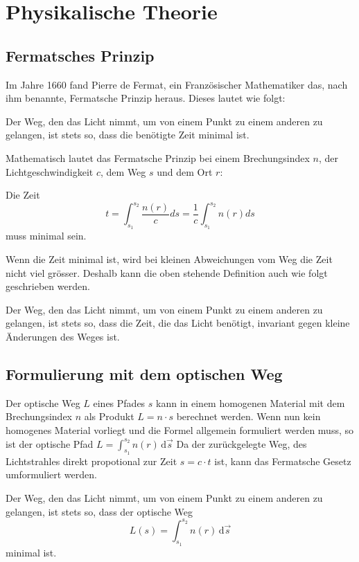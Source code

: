 \section{Physikalische Theorie}

\subsection{Fermatsches Prinzip}
Im Jahre 1660 fand Pierre de Fermat, 
ein Französischer Mathematiker das, 
nach ihm benannte, Fermatsche Prinzip heraus. 
Dieses lautet wie folgt:

Der Weg, den das Licht nimmt, 
um von einem Punkt zu einem anderen zu gelangen, 
ist stets so, dass die benötigte Zeit minimal ist.

Mathematisch lautet das Fermatsche Prinzip bei einem Brechungsindex $n$, 
der Lichtgeschwindigkeit $c$, dem Weg $s$ und dem Ort $r$: 

Die Zeit
\[
t= \int_{s_1}^{s_2} \frac{n(r)}{c} ds =
\frac{1}{c} \int_{s_1}^{s_2} n(r) ds
\]
muss minimal sein.

Wenn die Zeit minimal ist, 
wird bei kleinen Abweichungen vom Weg die Zeit nicht viel grösser. 
Deshalb kann die oben stehende Definition auch wie folgt geschrieben werden.

Der Weg, den das Licht nimmt, 
um von einem Punkt zu einem anderen zu gelangen, 
ist stets so, dass die Zeit, die das Licht benötigt, 
invariant gegen kleine Änderungen des Weges ist.

\subsection{Formulierung mit dem optischen Weg}
Der optische Weg $L$  eines Pfades $s$ kann in einem homogenen Material 
mit dem Brechungsindex $n$ als Produkt $L = n \cdot s$ berechnet werden.
Wenn nun kein homogenes Material vorliegt und die Formel allgemein 
formuliert werden muss, so ist der optische Pfad $L = \int_{s_1}^{s_2} n(r) \,\mathrm d \vec s$
Da der zurückgelegte Weg, des Lichtstrahles direkt propotional zur Zeit $s = c \cdot t$ ist,
kann das Fermatsche Gesetz umformuliert werden.

Der Weg, den das Licht nimmt, 
um von einem Punkt zu einem anderen zu gelangen, 
ist stets so, dass der optische Weg 
\[
L(s) = \int_{s_1}^{s_2} n(r) \,\mathrm d\vec s
\]
minimal ist.

